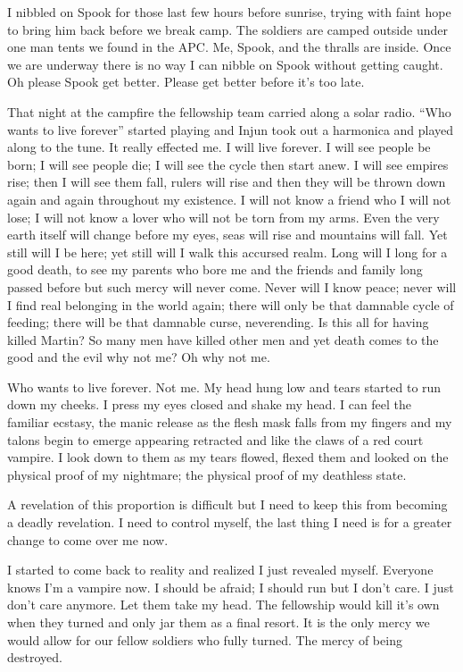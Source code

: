 I nibbled on Spook for those last few hours before sunrise, trying with faint hope to bring him back before we break camp. The soldiers are camped outside under one man tents we found in the APC. Me, Spook, and the thralls are inside. Once we are underway there is no way I can nibble on Spook without getting caught. Oh please Spook get better. Please get better before it's too late.

\parasep


That night at the campfire the fellowship team carried along a solar radio. ``Who wants to live forever'' started playing and Injun took out a harmonica and played along to the tune. It really effected me. I will live forever. I will see people be born; I will see people die; I will see the cycle then start anew. I will see empires rise; then I will see them fall, rulers will rise and then they will be thrown down again and again throughout my existence. I will not know a friend who I will not lose; I will not know a lover who will not be torn from my arms. Even the very earth itself will change before my eyes, seas will rise and mountains will fall. Yet still will I be here; yet still will I walk this accursed realm. Long will I long for a good death, to see my parents who bore me and the friends and family long passed before but such mercy will never come. Never will I know peace; never will I find real belonging in the world again; there will only be that damnable cycle of feeding; there will be that damnable curse, neverending. Is this all for having killed Martin? So many men have killed other men and yet death comes to the good and the evil why not me? Oh why not me.

Who wants to live forever. Not me. My head hung low and tears started to run down my cheeks. I press my eyes closed and shake my head. I can feel the familiar ecstasy, the manic release as the flesh mask falls from my fingers and my talons begin to emerge appearing retracted and like the claws of a red court vampire. I look down to them as my tears flowed, flexed them and looked on the physical proof of my nightmare; the physical proof of my deathless state.

A revelation of this proportion is difficult but I need to keep this from becoming a deadly revelation. I need to control myself, the last thing I need is for a greater change to come over me now.

I started to come back to reality and realized I just revealed myself. Everyone knows I'm a vampire now. I should be afraid; I should run but I don't care. I just don't care anymore. Let them take my head. The fellowship would kill it's own when they turned and only jar them as a final resort. It is the only mercy we would allow for our fellow soldiers who fully turned. The mercy of being destroyed.

